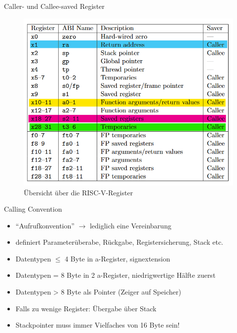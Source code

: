 \documentclass[
  german,            %
  aspectratio=169,    %
]{tumbeamer}
\begin{document}
\begin{frame}[c, fragile]{Caller- und Callee-saved Register}{}
  \begin{figure}[h]
    \includegraphics[height=0.75\textheight]{resources/w03_calling_conv_regs.png}
    \caption{Übersicht über die RISC-V-Register}
  \end{figure}
\end{frame}

\begin{frame}[c, fragile]{Calling Convention}{}
  \begin{itemize}
    \item \enquote{Aufrufkonvention} $\rightarrow$ lediglich eine Vereinbarung
    \item definiert Parameterüberabe, Rückgabe, Registersicherung, Stack etc.
    \item Datentypen $\le$ 4 Byte in a-Register, signextension
    \item Datentypen = 8 Byte in 2 a-Register, niedrigwertige Hälfte zuerst
    \item Datentypen > 8 Byte als Pointer (Zeiger auf Speicher)
    \item Falls zu wenige Register: Übergabe über Stack
    \item Stackpointer muss immer Vielfaches von 16 Byte sein!
  \end{itemize}
\end{frame}
\end{document}

